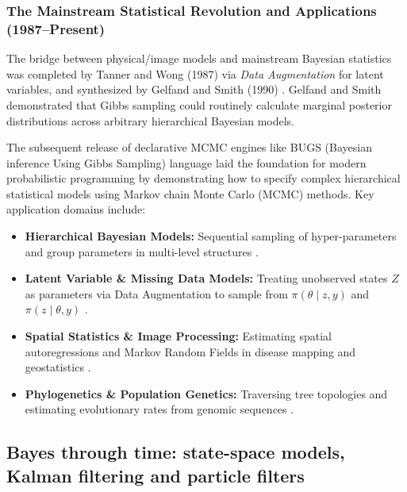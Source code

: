 \subsubsection{The Mainstream Statistical Revolution and Applications (1987--Present)}
\label{subsec:mcmc-applications}

The bridge between physical/image models and mainstream Bayesian statistics was completed by Tanner and Wong (1987) \cite{tannerwong1987} via \emph{Data Augmentation} for latent variables, and synthesized by Gelfand and Smith (1990) \cite{gelfandsmith1990}. Gelfand and Smith demonstrated that Gibbs sampling could routinely calculate marginal posterior distributions across arbitrary hierarchical Bayesian models.

The subsequent release of declarative MCMC engines like BUGS (Bayesian inference Using Gibbs Sampling) language \cite{gilks1994} laid the foundation for modern probabilistic programming by demonstrating how to specify complex hierarchical statistical models using Markov chain Monte Carlo (MCMC) methods. Key application domains include:

\begin{itemize}
    \item \textbf{Hierarchical Bayesian Models:} Sequential sampling of hyper-parameters and group parameters in multi-level structures \cite{gelman2013bayesian}.
    \item \textbf{Latent Variable \& Missing Data Models:} Treating unobserved states $Z$ as parameters via Data Augmentation to sample from $\pi(\theta \mid z, y)$ and $\pi(z \mid \theta, y)$ \cite{tannerwong1987}.
    \item \textbf{Spatial Statistics \& Image Processing:} Estimating spatial autoregressions and Markov Random Fields in disease mapping and geostatistics \cite{besag1974spatial}.
    \item \textbf{Phylogenetics \& Population Genetics:} Traversing tree topologies and estimating evolutionary rates from genomic sequences \cite{yang2014molecular}.
\end{itemize}




\subsection{Bayes through time: state-space models, Kalman filtering and particle filters}


